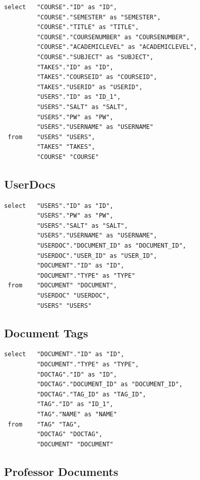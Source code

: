 \documentclass[11pt]{article}
\begin{document}
\begin{verbatim}
select   "COURSE"."ID" as "ID",
         "COURSE"."SEMESTER" as "SEMESTER",
         "COURSE"."TITLE" as "TITLE",
         "COURSE"."COURSENUMBER" as "COURSENUMBER",
         "COURSE"."ACADEMICLEVEL" as "ACADEMICLEVEL",
         "COURSE"."SUBJECT" as "SUBJECT",
         "TAKES"."ID" as "ID",
         "TAKES"."COURSEID" as "COURSEID",
         "TAKES"."USERID" as "USERID",
         "USERS"."ID" as "ID_1",
         "USERS"."SALT" as "SALT",
         "USERS"."PW" as "PW",
         "USERS"."USERNAME" as "USERNAME" 
 from    "USERS" "USERS",
         "TAKES" "TAKES",
         "COURSE" "COURSE"
\end{verbatim}
\subsection{UserDocs}
\label{sec-5-2}



\begin{verbatim}
select   "USERS"."ID" as "ID",
         "USERS"."PW" as "PW",
         "USERS"."SALT" as "SALT",
         "USERS"."USERNAME" as "USERNAME",
         "USERDOC"."DOCUMENT_ID" as "DOCUMENT_ID",
         "USERDOC"."USER_ID" as "USER_ID",
         "DOCUMENT"."ID" as "ID",
         "DOCUMENT"."TYPE" as "TYPE" 
 from    "DOCUMENT" "DOCUMENT",
         "USERDOC" "USERDOC",
         "USERS" "USERS"
\end{verbatim}
\subsection{Document Tags}
\label{sec-5-3}


\begin{verbatim}
select   "DOCUMENT"."ID" as "ID",
         "DOCUMENT"."TYPE" as "TYPE",
         "DOCTAG"."ID" as "ID",
         "DOCTAG"."DOCUMENT_ID" as "DOCUMENT_ID",
         "DOCTAG"."TAG_ID" as "TAG_ID",
         "TAG"."ID" as "ID_1",
         "TAG"."NAME" as "NAME" 
 from    "TAG" "TAG",
         "DOCTAG" "DOCTAG",
         "DOCUMENT" "DOCUMENT"
\end{verbatim}
\subsection{Professor Documents}
\label{sec-5-4}
\end{document}
